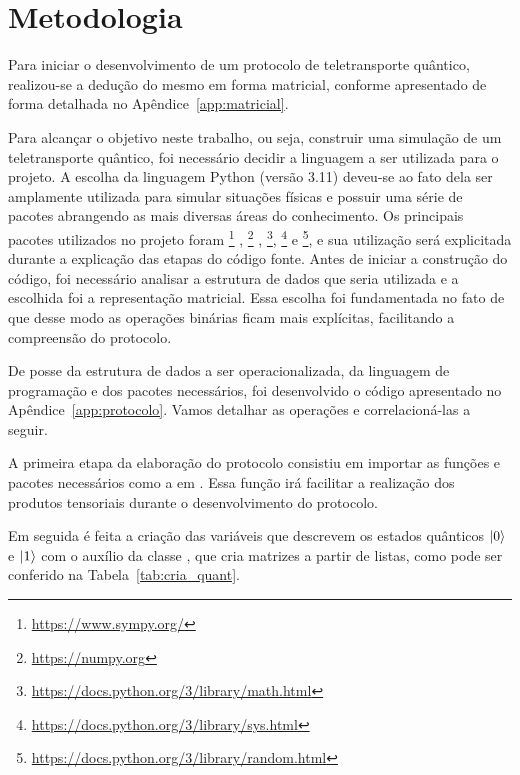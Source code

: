 
\chapter{Metodologia}

Para iniciar o desenvolvimento de um protocolo de teletransporte quântico, realizou-se a dedução do mesmo em forma matricial, conforme apresentado de forma detalhada no Apêndice~\ref{app:matricial}.

Para alcançar o objetivo neste trabalho, ou seja, construir uma simulação de um teletransporte quântico, foi necessário decidir a linguagem a ser utilizada para o projeto. A escolha da linguagem Python (versão 3.11) deveu-se ao fato dela ser amplamente utilizada para simular situações físicas e possuir uma série de pacotes abrangendo as mais diversas áreas do conhecimento. Os principais pacotes utilizados no projeto foram \footnote{\url{https://www.sympy.org/}} \cite{sympy}, \footnote{\url{https://numpy.org}} \cite{harris2020array}, \footnote{\url{https://docs.python.org/3/library/math.html}}, \footnote{\url{https://docs.python.org/3/library/sys.html}} e \footnote{\url{https://docs.python.org/3/library/random.html}}, e sua utilização será explicitada durante a explicação das etapas do código fonte. Antes de iniciar a construção do código, foi necessário analisar a estrutura de dados que seria utilizada e a escolhida foi a representação matricial. Essa escolha foi fundamentada no fato de que desse modo as operações binárias ficam mais explícitas, facilitando a compreensão do protocolo.

De posse da estrutura de dados a ser operacionalizada, da linguagem de programação e dos pacotes necessários, foi desenvolvido o código apresentado no Apêndice~\ref{app:protocolo}. Vamos detalhar as operações e correlacioná-las a seguir.

A primeira etapa da elaboração do protocolo consistiu em importar as funções e pacotes necessários como a  em . Essa função irá facilitar a realização dos produtos tensoriais durante o desenvolvimento do protocolo.

Em seguida é feita a criação das variáveis que descrevem os estados quânticos $\ket{0}$ e $\ket{1}$ com o auxílio da classe , que cria matrizes a partir de listas, como pode ser conferido na Tabela~\ref{tab:cria_quant}.

